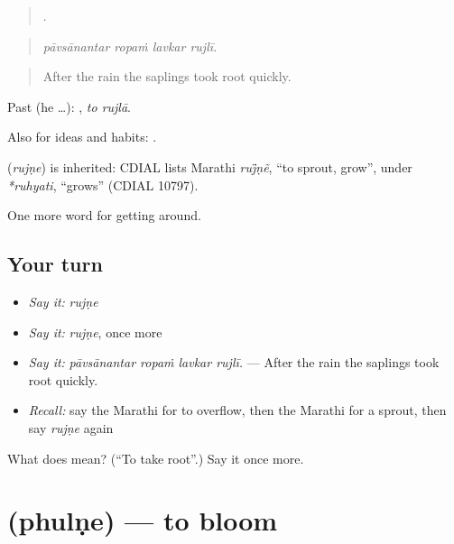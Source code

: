 \begin{quote}
   .
\end{quote}

\begin{quote}
\emph{pāvsānantar ropaṁ lavkar rujlī.}
\end{quote}

\begin{quote}
After the rain the saplings took root quickly.
\end{quote}

Past (he …):  , \emph{to rujlā}.

Also for ideas and habits:  .

\begin{cousinweb}
\textbf{} (\emph{rujṇe}) is inherited: CDIAL lists Marathi \emph{ruj̈ṇẽ}, \textquotedblleft{}to sprout, grow\textquotedblright{}, under \emph{*ruhyati}, \textquotedblleft{}grows\textquotedblright{} (CDIAL 10797).
\end{cousinweb}

\begin{grammarlens}[title={What you've built}]
One more word for getting around.
\end{grammarlens}

\subsection*{Your turn}
\begin{itemize}
\raggedright
  \item \emph{Say it:} \emph{rujṇe}
  \item \emph{Say it:} \emph{rujṇe}, once more
  \item \emph{Say it:} \emph{pāvsānantar ropaṁ lavkar rujlī.} — After the rain the saplings took root quickly.
  \item \emph{Recall:} say the Marathi for to overflow, then the Marathi for a sprout, then say \emph{rujṇe} again
\end{itemize}

\begin{tcolorbox}[breakable,colback=teal!4,colframe=teal!35!black,title={Before you move on}]
What does  mean? (\textquotedblleft{}To take root\textquotedblright{}.) Say it once more.
\end{tcolorbox}
\section[\texorpdfstring{\mr{फुलणे} (phulṇe)}{फुलणे (phulṇe)}]{ (phulṇe) — to bloom}

